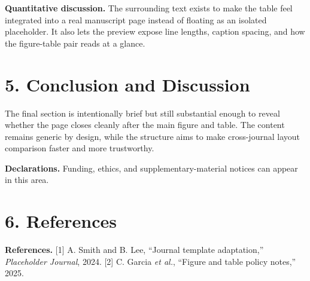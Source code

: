\documentclass[10pt,a4paper]{article}
\begin{document}
\textbf{Quantitative discussion.} The surrounding text exists to make the table feel integrated into a real manuscript page instead of floating as an isolated placeholder. It also lets the preview expose line lengths, caption spacing, and how the figure-table pair reads at a glance.

\section*{5. Conclusion and Discussion}
The final section is intentionally brief but still substantial enough to reveal whether the page closes cleanly after the main figure and table. The content remains generic by design, while the structure aims to make cross-journal layout comparison faster and more trustworthy.


\noindent \textbf{Declarations.} Funding, ethics, and supplementary-material notices can appear in this area.\par
\section*{6. References}
\vspace{0.5em}
\noindent \textbf{References.} [1] A. Smith and B. Lee, ``Journal template adaptation,'' \textit{Placeholder Journal}, 2024. [2] C. Garcia \textit{et al.}, ``Figure and table policy notes,'' 2025.\par
\vspace{0.6em}
\end{document}
